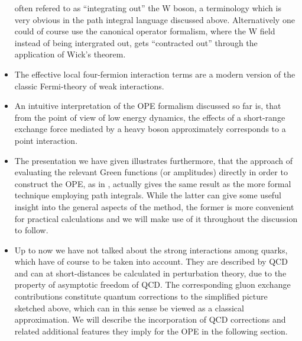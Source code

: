 \begin{itemize}
often refered to as ``integrating out'' the W boson, a terminology
which is very obvious in the path integral language discussed above.
Alternatively one could of course use the canonical operator
formalism, where the W field instead of being intergrated out, gets
``contracted out'' through the application of Wick's theorem.
\item The effective local four-fermion interaction terms are a
modern version of the classic Fermi-theory of weak interactions.
\item An intuitive interpretation of the OPE formalism discussed so
far is, that from the point of view of low energy dynamics, the effects
of a short-range exchange force mediated by a heavy boson
approximately corresponds to a point interaction.
\item The presentation we have given illustrates furthermore, that
the approach of evaluating the relevant Green functions (or amplitudes)
directly in order to construct the OPE, as in , actually gives
the same result as the more formal technique employing path integrals.
While the latter can give some useful insight into the general aspects
of the method, the former is more convenient for practical calculations
and we will make use of it throughout the discussion to follow.
\item Up to now we have not talked about the strong interactions
among quarks, which have of course to be taken into account. They are
described by QCD and can at short-distances be calculated in
perturbation theory, due to the property of asymptotic freedom of QCD.
The corresponding gluon exchange contributions constitute quantum
corrections to the simplified picture sketched above, which can in this
sense be viewed as a classical approximation. We will describe the
incorporation of QCD corrections and related additional features
they imply for the OPE in the following section.
\end{itemize}

